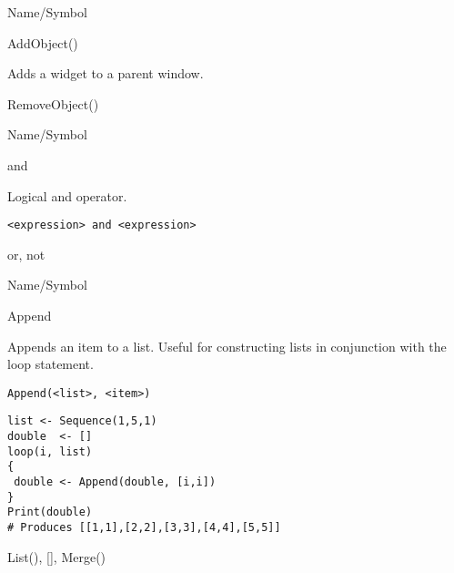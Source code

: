 \rl
 


\begin{desc}{Name/Symbol}

\item[Name/Symbol]  	AddObject()

\item[Description] 	Adds a widget to a parent window.

\item[Usage]		

\item[Example]	

\item[See Also]    	RemoveObject()
\end{desc}

\rl



\begin{desc}{Name/Symbol}
\item[Name/Symbol]  	and
  
\item[Description]  	Logical and operator.

\item[Usage]       	
\begin{verbatim}
<expression> and <expression>
\end{verbatim}

\item[Example]	

\item[See Also]     	or, not

\end{desc}

\rl


\begin{desc}{Name/Symbol}

\item[Name/Symbol]  	Append
  
\item[Description]  	Appends an item to a list.  Useful for constructing lists in conjunction with the loop statement.

\item[Usage] 
\begin{verbatim}
Append(<list>, <item>)
\end{verbatim}

\item[Example]
\begin{verbatim}
list <- Sequence(1,5,1)
double  <- []
loop(i, list)
{
 double <- Append(double, [i,i])
}
Print(double)
# Produces [[1,1],[2,2],[3,3],[4,4],[5,5]]
\end{verbatim}

\item[See Also]     	List(), [], Merge()
\end{desc}

